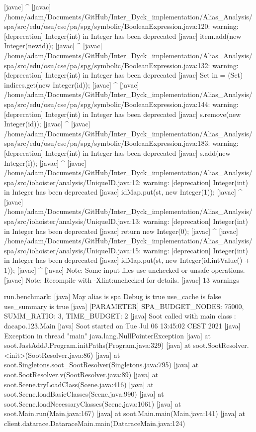     [javac] 			            ^
    [javac] /home/adam/Documents/GitHub/Inter_Dyck_implementation/Alias_Analysis/spa/src/edu/osu/cse/pa/spg/symbolic/BooleanExpression.java:120: warning: [deprecation] Integer(int) in Integer has been deprecated
    [javac] 			item.add(new Integer(newid));
    [javac] 			         ^
    [javac] /home/adam/Documents/GitHub/Inter_Dyck_implementation/Alias_Analysis/spa/src/edu/osu/cse/pa/spg/symbolic/BooleanExpression.java:132: warning: [deprecation] Integer(int) in Integer has been deprecated
    [javac] 		Set in = (Set) indices.get(new Integer(id));
    [javac] 		                           ^
    [javac] /home/adam/Documents/GitHub/Inter_Dyck_implementation/Alias_Analysis/spa/src/edu/osu/cse/pa/spg/symbolic/BooleanExpression.java:144: warning: [deprecation] Integer(int) in Integer has been deprecated
    [javac] 					s.remove(new Integer(id));
    [javac] 					         ^
    [javac] /home/adam/Documents/GitHub/Inter_Dyck_implementation/Alias_Analysis/spa/src/edu/osu/cse/pa/spg/symbolic/BooleanExpression.java:183: warning: [deprecation] Integer(int) in Integer has been deprecated
    [javac] 				s.add(new Integer(i));
    [javac] 				      ^
    [javac] /home/adam/Documents/GitHub/Inter_Dyck_implementation/Alias_Analysis/spa/src/iohoister/analysis/UniqueID.java:12: warning: [deprecation] Integer(int) in Integer has been deprecated
    [javac] 			idMap.put(st, new Integer(1));
    [javac] 			              ^
    [javac] /home/adam/Documents/GitHub/Inter_Dyck_implementation/Alias_Analysis/spa/src/iohoister/analysis/UniqueID.java:13: warning: [deprecation] Integer(int) in Integer has been deprecated
    [javac] 			return new Integer(0);
    [javac] 			       ^
    [javac] /home/adam/Documents/GitHub/Inter_Dyck_implementation/Alias_Analysis/spa/src/iohoister/analysis/UniqueID.java:15: warning: [deprecation] Integer(int) in Integer has been deprecated
    [javac] 			idMap.put(st, new Integer(id.intValue() + 1));
    [javac] 			              ^
    [javac] Note: Some input files use unchecked or unsafe operations.
    [javac] Note: Recompile with -Xlint:unchecked for details.
    [javac] 13 warnings

run.benchmark:
     [java] May alias is spa   Debug is true   use_cache is false  use_summary is true
     [java] [PARAMETER] SPA_BUDGET_NODES: 75000, SUMM_RATIO: 3, TIME_BUDGET: 2
     [java] Soot called with main class : dacapo.123.Main
     [java] Soot started on Tue Jul 06 13:45:02 CEST 2021
     [java] Exception in thread "main" java.lang.NullPointerException
     [java] 	at soot.JastAddJ.Program.initPaths(Program.java:329)
     [java] 	at soot.SootResolver.<init>(SootResolver.java:86)
     [java] 	at soot.Singletons.soot_SootResolver(Singletons.java:795)
     [java] 	at soot.SootResolver.v(SootResolver.java:89)
     [java] 	at soot.Scene.tryLoadClass(Scene.java:416)
     [java] 	at soot.Scene.loadBasicClasses(Scene.java:990)
     [java] 	at soot.Scene.loadNecessaryClasses(Scene.java:1061)
     [java] 	at soot.Main.run(Main.java:167)
     [java] 	at soot.Main.main(Main.java:141)
     [java] 	at client.datarace.DataraceMain.main(DataraceMain.java:124)

